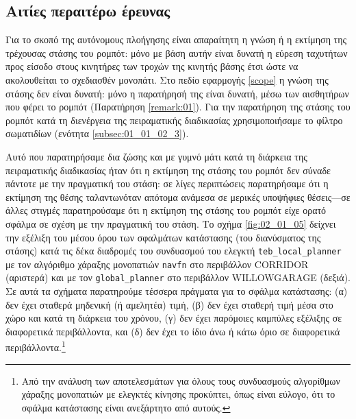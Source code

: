 \subsection{Αιτίες περαιτέρω έρευνας}
\label{subsection:02_01_05:02}

Για το σκοπό της αυτόνομους πλοήγησης είναι απαραίτητη η γνώση ή η εκτίμηση της
τρέχουσας στάσης του ρομπότ: μόνο με βάση αυτήν είναι δυνατή η εύρεση ταχυτήτων
προς είσοδο στους κινητήρες των τροχών της κινητής βάσης έτσι ώστε να
ακολουθείται το σχεδιασθέν μονοπάτι. Στο πεδίο εφαρμογής \ref{scope} η γνώση
της στάσης δεν είναι δυνατή: μόνο η παρατήρησή της είναι δυνατή, μέσω των
αισθητήρων που φέρει το ρομπότ (Παρατήρηση \ref{remark:01}). Για την παρατήρηση
της στάσης του ρομπότ κατά τη διενέργεια της πειραματικής διαδικασίας
χρησιμοποιήσαμε το φίλτρο σωματιδίων (ενότητα \ref{subsec:01_01_02_3}).

Αυτό που παρατηρήσαμε δια ζώσης και με γυμνό μάτι κατά τη διάρκεια της
πειραματικής διαδικασίας ήταν ότι η εκτίμηση της στάσης του ρομπότ δεν σύναδε
πάντοτε με την πραγματική του στάση: σε λίγες περιπτώσεις παρατηρήσαμε ότι η
εκτίμηση της θέσης ταλαντωνόταν απότομα ανάμεσα σε μερικές υποψήφιες
θέσεις---σε άλλες στιγμές παρατηρούσαμε ότι η εκτίμηση της στάσης του ρομπότ
είχε ορατό σφάλμα σε σχέση με την πραγματική του στάση. Το σχήμα
\ref{fig:02_01_05} δείχνει την εξέλιξη του μέσου όρου των σφαλμάτων κατάστασης
(του διανύσματος της στάσης) κατά τις δέκα διαδρομές του συνδυασμού του ελεγκτή
\texttt{teb\_local\_planner} με τον αλγόριθμο χάραξης μονοπατιών \texttt{navfn}
στο περιβάλλον CORRIDOR (αριστερά) και με τον \texttt{global\_planner} στο
περιβάλλον WILLOWGARAGE (δεξιά). Σε αυτά τα σχήματα παρατηρούμε τέσσερα
πράγματα για το σφάλμα κατάστασης:
(α) δεν έχει σταθερά μηδενική (ή αμελητέα) τιμή,
(β) δεν έχει σταθερή τιμή μέσα στο χώρο και κατά τη διάρκεια του χρόνου,
(γ) δεν έχει παρόμοιες καμπύλες εξέλιξης σε διαφορετικά περιβάλλοντα, και
(δ) δεν έχει το ίδιο άνω ή κάτω όριο σε διαφορετικά περιβάλλοντα.\footnote{Από
την ανάλυση των αποτελεσμάτων για όλους τους συνδυασμούς αλγορίθμων χάραξης
μονοπατιών με ελεγκτές κίνησης προκύπτει, όπως είναι εύλογο, ότι το σφάλμα
κατάστασης είναι ανεξάρτητο από αυτούς.}

